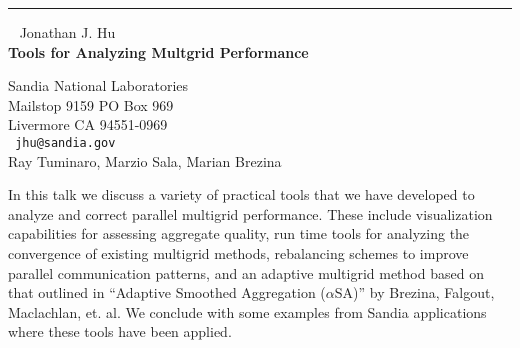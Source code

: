 \documentclass{report}
\begin{document}
\begin{center}

\rule{6in}{1pt} \
{\large
Jonathan J. Hu
\\ {\bf
Tools for Analyzing Multgrid Performance
}}

Sandia National Laboratories \\
Mailstop 9159 PO Box 969 \\
Livermore CA 94551-0969
\\ {\tt
jhu@sandia.gov
}
\\
Ray Tuminaro,
Marzio Sala,
Marian Brezina
\end{center}

In this talk we discuss a variety of practical tools that we have
developed to analyze and correct parallel multigrid performance. These
include visualization capabilities for assessing aggregate quality, run
time tools for analyzing the convergence of existing multigrid methods,
rebalancing schemes to improve parallel communication patterns, and an
adaptive multigrid method based on that outlined in ``Adaptive Smoothed
Aggregation ($\alpha$SA)'' by Brezina, Falgout, Maclachlan, et. al. We
conclude with some examples from Sandia applications where these tools
have been applied.
\end{document}
